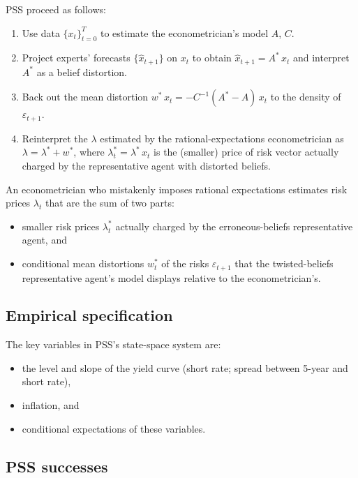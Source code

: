 \documentclass[12pt]{article}
\theoremstyle{definition}
\begin{document}
PSS proceed as follows:
\begin{enumerate}
\item Use data $\{x_t\}_{t=0}^T$ to estimate the econometrician's model
      $A$, $C$.
\item Project experts' forecasts $\{\hat x_{t+1}\}$ on $x_t$ to obtain
      $\hat x_{t+1} = A^*\, x_t$ and interpret $A^*$ as a belief
      distortion.
\item Back out the mean distortion
      $w^*\, x_t = -C^{-1}(A^* - A)\, x_t$ to the density of
      $\varepsilon_{t+1}$.
\item Reinterpret the $\lambda$ estimated by the rational-expectations
      econometrician as $\lambda = \lambda^* + w^*$, where
      $\lambda_t^* = \lambda^*\, x_t$ is the (smaller) price of risk
      vector actually charged by the representative agent with distorted
      beliefs.
\end{enumerate}

An econometrician who mistakenly imposes rational expectations estimates
risk prices $\lambda_t$ that are the sum of two parts:
\begin{itemize}
\item smaller risk prices $\lambda_t^*$ actually charged by the
      erroneous-beliefs representative agent, and
\item conditional mean distortions $w_t^*$ of the risks
      $\varepsilon_{t+1}$ that the twisted-beliefs representative
      agent's model displays relative to the econometrician's.
\end{itemize}

\subsection{Empirical specification}

The key variables in PSS's state-space system are:
\begin{itemize}
\item the level and slope of the yield curve (short rate; spread between
      5-year and short rate),
\item inflation, and
\item conditional expectations of these variables.
\end{itemize}

\subsection{PSS successes}
\end{document}
